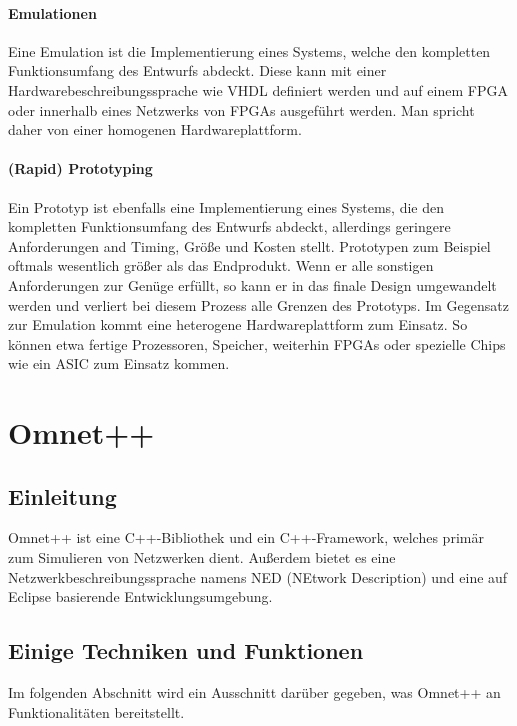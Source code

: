 \paragraph{Emulationen}

Eine Emulation ist die Implementierung eines Systems, welche den kompletten Funktionsumfang des Entwurfs abdeckt. Diese kann mit einer Hardwarebeschreibungssprache wie VHDL definiert werden und auf einem FPGA oder innerhalb eines Netzwerks von FPGAs ausgeführt werden. Man spricht daher von einer homogenen Hardwareplattform.

\paragraph{(Rapid) Prototyping}

Ein Prototyp ist ebenfalls eine Implementierung eines Systems, die den kompletten Funktionsumfang des Entwurfs abdeckt, allerdings geringere Anforderungen and Timing, Größe und Kosten stellt. Prototypen zum Beispiel oftmals wesentlich größer als das Endprodukt. Wenn er alle sonstigen Anforderungen zur Genüge erfüllt, so kann er in das finale Design umgewandelt werden und verliert bei diesem Prozess alle Grenzen des Prototyps. Im Gegensatz zur Emulation kommt eine heterogene Hardwareplattform zum Einsatz. So können etwa fertige Prozessoren, Speicher, weiterhin FPGAs oder spezielle Chips wie ein ASIC zum Einsatz kommen.

\section{Omnet++}

\subsection{Einleitung}

Omnet++\cite{omnet} ist eine C++-Bibliothek und ein C++-Framework, welches primär zum Simulieren von Netzwerken dient. Außerdem bietet es eine Netzwerkbeschreibungssprache namens NED (NEtwork Description) und eine auf Eclipse\cite{eclipse} basierende Entwicklungsumgebung.

\subsection{Einige Techniken und Funktionen}

Im folgenden Abschnitt wird ein Ausschnitt darüber gegeben, was Omnet++ an Funktionalitäten bereitstellt.

